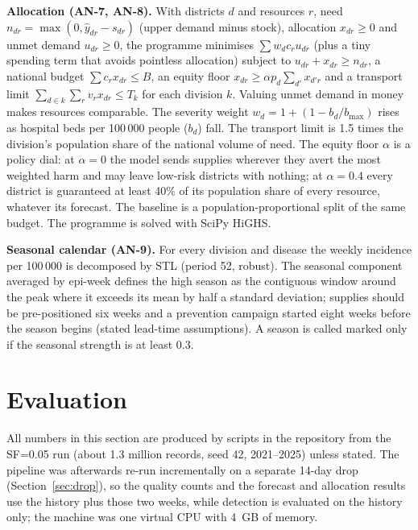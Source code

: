 \documentclass[conference]{IEEEtran}
\begin{document}
\textbf{Allocation (AN-7, AN-8).} With districts $d$ and resources $r$, need $n_{dr}=\max(0,\hat y_{dr}-s_{dr})$ (upper demand minus stock), allocation $x_{dr}\ge0$ and unmet demand $u_{dr}\ge0$, the programme minimises $\sum w_dc_ru_{dr}$ (plus a tiny spending term that avoids pointless allocation) subject to $u_{dr}+x_{dr}\ge n_{dr}$, a national budget $\sum c_rx_{dr}\le B$, an equity floor $x_{dr}\ge\alpha p_d\sum_{d'}x_{d'r}$ and a transport limit $\sum_{d\in k}\sum_rv_rx_{dr}\le T_k$ for each division $k$. Valuing unmet demand in money makes resources comparable. The severity weight $w_d=1+(1-b_d/b_{\max})$ rises as hospital beds per 100\,000 people ($b_d$) fall. The transport limit is 1.5 times the division's population share of the national volume of need. The equity floor $\alpha$ is a policy dial: at $\alpha=0$ the model sends supplies wherever they avert the most weighted harm and may leave low-risk districts with nothing; at $\alpha=0.4$ every district is guaranteed at least 40\% of its population share of every resource, whatever its forecast. The baseline is a population-proportional split of the same budget. The programme is solved with SciPy HiGHS.

\textbf{Seasonal calendar (AN-9).} For every division and disease the weekly incidence per 100\,000 is decomposed by STL (period 52, robust). The seasonal component averaged by epi-week defines the high season as the contiguous window around the peak where it exceeds its mean by half a standard deviation; supplies should be pre-positioned six weeks and a prevention campaign started eight weeks before the season begins (stated lead-time assumptions). A season is called marked only if the seasonal strength is at least 0.3.
\section{Evaluation}\label{sec:eval}
All numbers in this section are produced by scripts in the repository from the SF=0.05 run (about 1.3 million records, seed 42, 2021--2025) unless stated. The pipeline was afterwards re-run incrementally on a separate 14-day drop (Section~\ref{sec:drop}), so the quality counts and the forecast and allocation results use the history plus those two weeks, while detection is evaluated on the history only; the machine was one virtual CPU with 4~GB of memory.
\end{document}
